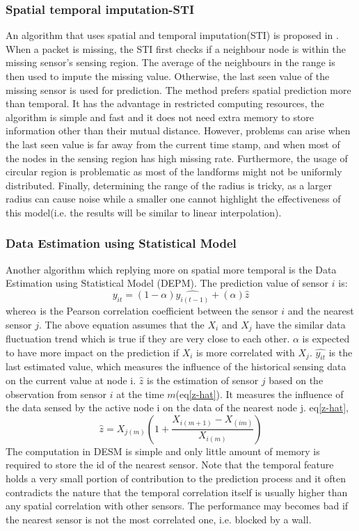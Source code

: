 \subsubsection{Spatial temporal imputation-STI}
An algorithm that uses spatial and temporal imputation(STI) is proposed in \cite{li2008spatial}. 
When a packet is missing, the STI first checks if a neighbour node is within the missing sensor's sensing region. 
The average of the neighbours in the range is then used to impute the missing value. 
Otherwise, the last seen value of the missing sensor is used for prediction. 
The method prefers spatial prediction more than temporal. 
It has the advantage in restricted computing resources, the algorithm is simple and fast and it does not need extra memory to store information other than their mutual distance.
However, problems can arise when the last seen value is far away from the current time stamp, and when most of the nodes in the sensing region has high missing rate. 
Furthermore, the usage of circular region is problematic as most of the landforms might not be uniformly distributed. Finally, determining the range of the radius is tricky, as a larger radius can cause noise while a smaller one cannot highlight the effectiveness of this model(i.e. the results will be similar to linear interpolation).
\subsubsection{Data Estimation using Statistical Model}
Another algorithm which replying more on spatial more temporal is the Data Estimation using Statistical Model (DEPM)\cite{li2008data}.  
The prediction value of sensor $i$ is:
\begin{equation}
\hat{y_{it}} = (1-\alpha)\hat{y_{i(t-1)}} + (\alpha)\hat{z}
\end{equation}
where$\alpha$ is the Pearson correlation coefficient between the sensor $i$ and the nearest sensor $j$.
The above equation assumes that the $X_i$ and $X_j$ have the similar data fluctuation trend which is true if they are very close to each other. 
$\alpha$ is expected to have more impact on the prediction if $X_i$ is more correlated with $X_j$. 
$\hat{y_{it}}$ is the last estimated value, which measures the influence of the historical sensing data on the current value at node i. 
$\hat{z}$ is the estimation of sensor $j$ based on the observation from sensor $i$ at the time $m$(eq\ref{z-hat}). It measures the influence of the data sensed by the active node i on the data of the nearest node j. eq\ref{z-hat},  
\begin{equation}
\hat{z} = X_{j(m)}(1+\frac{X_{i(m+1)}-X_{(im)}}{X_{i(m)}})
\label{z-hat}
\end{equation}
The computation in DESM is simple and only little amount of memory is required to store the id of the nearest sensor. 
Note that the temporal feature holds a very small portion of contribution to the prediction process and it often contradicts the nature that the temporal correlation itself is usually higher than any spatial correlation with other sensors. The performance may becomes bad if the nearest sensor is not the most correlated one, i.e. blocked by a wall.
